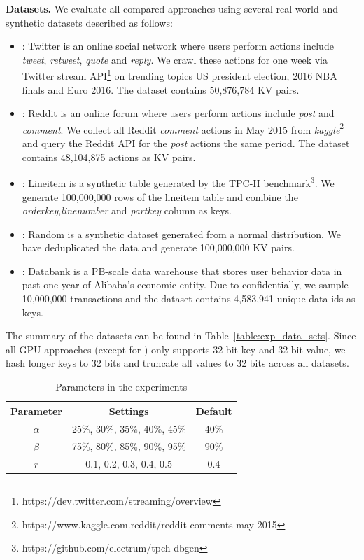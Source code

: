 \vspace{1mm}\noindent\textbf{Datasets.} We evaluate all compared approaches using several real world and synthetic datasets described as follows:
\begin{itemize}
	\item \dstwitter: Twitter is an online social network where users perform actions include \emph{tweet}, \emph{retweet}, \emph{quote} and \emph{reply}.
	We crawl these actions for one week via Twitter stream API\footnote{https://dev.twitter.com/streaming/overview} on trending topics US president election, 2016 NBA finals and Euro 2016. The dataset contains 50,876,784 KV pairs.
	\item \dsreddit: Reddit is an online forum where users perform actions include \emph{post} and \emph{comment}. We collect all Reddit \emph{comment} actions in May 2015 from \emph{kaggle}\footnote{https://www.kaggle.com.reddit/reddit-comments-may-2015} and query the Reddit API for the \emph{post} actions the same period. The dataset contains 48,104,875 actions as KV pairs. 
 	\item \dstpch: Lineitem is a synthetic table generated by the TPC-H benchmark\footnote{https://github.com/electrum/tpch-dbgen}. We generate  100,000,000 rows of the lineitem table and combine the \emph{orderkey},\emph{linenumber} and \emph{partkey} column as keys. 
	\item \dsrandom: Random is a synthetic dataset generated from a normal distribution. We have deduplicated the data and generate 100,000,000 KV pairs.  
	\item \dsali: Databank is a PB-scale data warehouse that stores user behavior data in past one year of Alibaba's economic entity. Due to confidentially, we sample 10,000,000 transactions and the dataset contains 4,583,941 unique data ids as keys.
\end{itemize}
The summary of the datasets can be found in Table~\ref{table:exp_data_sets}.
Since all GPU approaches (except for \voter) only supports 32 bit key and 32 bit value, we hash longer keys to 32 bits and truncate all values to 32 bits across all datasets. 


\begin{table}
	\centering
	\caption{Parameters in the experiments}
	\label{tbl:parameters}
	\begin{tabular}{|c|c|c|}
		\hline
		\textbf{Parameter} & \textbf{Settings} & \textbf{Default} \\ \hline
		$\alpha$ & 25\%, 30\%, 35\%, 40\%, 45\% & 40\% \\ \hline
		$\beta$  & 75\%, 80\%, 85\%, 90\%, 95\% & 90\% \\ \hline
		$r$ & 0.1, 0.2, 0.3, 0.4, 0.5 & 0.4 \\ \hline
	\end{tabular}
\end{table}

